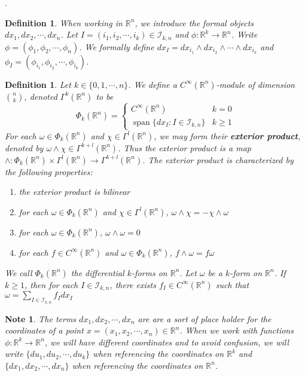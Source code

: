 \documentclass[12pt]{amsart}
\newtheorem{defn}[thm]{Definition}
\newtheorem{note}[thm]{Note}
\newcommand{\om}{\omega}
\newcommand{\R}{\mathbb{R}}
\newcommand{\MI}{\mathcal{I}}
\DeclareMathOperator{\spn}{span}
\begin{document}
	
	
	
	
	
	
	
	
	
	
	
	\newpage.
	\newpage 
	\begin{defn}
		When working in $\R^n$, we introduce the formal objects $dx_1, dx_2, \cdots, dx_n$. Let $I = (i_1, i_2, \cdots, i_k)\in \MI_{k,n}$ and $\phi: \R^k \rightarrow \R^n$. Write $\phi = (\phi_1, \phi_2, \cdots, \phi_n)$. We formally define $dx_I = dx_{i_1}\wedge dx_{i_2} \wedge \cdots \wedge dx_{i_k}$ and $\phi_I = (\phi_{i_1}, \phi_{i_2}, \cdots, \phi_{i_k})$.   
	\end{defn}
	
	\begin{defn}
		Let $k \in \{0, 1, \cdots, n\}$. We define a $C^{\infty}(\R^n)$-module of dimension ${n \choose k}$, denoted $\Gamma^k(\R^n)$ to be 
		\[
		\Phi_k(\R^n) =
		\begin{cases}
			C^{\infty}(\R^n) & k = 0 \\
			\spn \{ dx_I: I \in \MI_{k,n} \} & k \geq 1
		\end{cases}
		\]
		For each $\om \in \Phi_k(\R^n)$ and $\chi \in \Gamma^l(\R^n)$,   we may form their \textbf{exterior product}, denoted by $\om \wedge \chi \in \Gamma^{k+l}(\R^n)$. Thus the exterior product is a map $\wedge : \Phi_k(\R^n) \times \Gamma^l(\R^n)\rightarrow \Gamma^{k+l}(\R^n)$. The exterior product is characterized by the following properties:
		\begin{enumerate}
			\item the exterior product is bilinear
			\item for each $\om \in \Phi_k(\R^n)$ and $\chi \in \Gamma^l(\R^n)$, $\om \wedge \chi = - \chi \wedge \om$ 
			\item for each $\om \in \Phi_k(\R^n)$, $\om \wedge \om = 0$
			\item for each $f \in C^{\infty}(\R^n)$ and $ \om \in \Phi_k(\R^n)$, $f \wedge \om = f \om$
		\end{enumerate}
		We call $\Phi_k(\R^n)$ the differential $k$-forms on $\R^n$. Let $\om$ be a $k$-form on $\R^n$. If $k \geq 1$, then for each $I \in \MI_{k,n}$, there exists $f_I \in C^{\infty}(\R^n)$ such that $\om = \sum\limits_{I \in \MI_{k,n}} f_I dx_I$
	\end{defn}
	
	
	\begin{note}
		The terms $dx_1, dx_2, \cdots, dx_n$ are are a sort of place holder for the coordinates of a point $x = (x_1, x_2, \cdots, x_n) \in \R^n$. When we work with functions $\phi: \R^k \rightarrow \R^n$, we will have different coordinates and to avoid confusion, we will write $\{du_1, du_2, \cdots, du_k\}$ when referencing the coordinates on $\R^k$ and $\{dx_1, dx_2, \cdots, dx_n\}$ when referencing the coordinates on $\R^n$. 
	\end{note}
\end{document}
